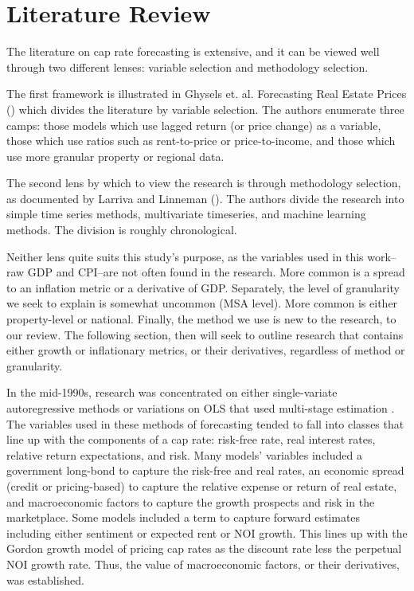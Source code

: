 \label{intro}


\section{Literature Review}

The literature on cap rate forecasting is extensive, and it can be viewed well through two different lenses: variable selection and methodology selection. 

The first framework is illustrated in Ghysels et. al. Forecasting Real Estate Prices (\citeyear{ghysels_plazzi_valkanov_torous_2013}) which divides the literature by variable selection. The authors enumerate three camps: those models which use lagged return (or price change) as a variable, those which use ratios such as rent-to-price or price-to-income, and those which use more granular property or regional data. 

The second lens by which to view the research is through methodology selection, as documented by Larriva and Linneman (\citeyear{larriva2021determinants}). The authors divide the research into simple time series methods, multivariate timeseries, and machine learning methods. The division is roughly chronological. 

Neither lens quite suits this study's purpose, as the variables used in this work--raw GDP and CPI--are not often found in the research. More common is a spread to an inflation metric or a derivative of GDP. Separately, the level of granularity we seek to explain is somewhat uncommon (MSA level). More common is either property-level or national. Finally, the method we use is new to the research, to our review. The following section, then will seek to outline research that contains either growth or inflationary metrics, or their derivatives, regardless of method or granularity.

In the mid-1990s, research was concentrated on either single-variate autoregressive methods \citep*{gau_1984,gau_1985,linneman_1986} or variations on OLS that used multi-stage estimation \citep*{case_shiller_1990,abraham_hendershott_1994}. The variables used in these methods of forecasting tended to fall into classes that line up with the components of a cap rate: risk-free rate, real interest rates, relative return expectations, and risk. Many models’ variables included a government long-bond  to capture the risk-free and real rates, an economic spread (credit or pricing-based) to capture the relative expense or return of real estate, and macroeconomic factors to capture the  growth prospects and risk in the marketplace. Some models included a term to capture forward estimates including either sentiment or expected rent or NOI growth. This lines up with the Gordon growth model of pricing cap rates as the discount rate less the perpetual NOI growth rate. Thus, the value of macroeconomic factors, or their derivatives, was established.

